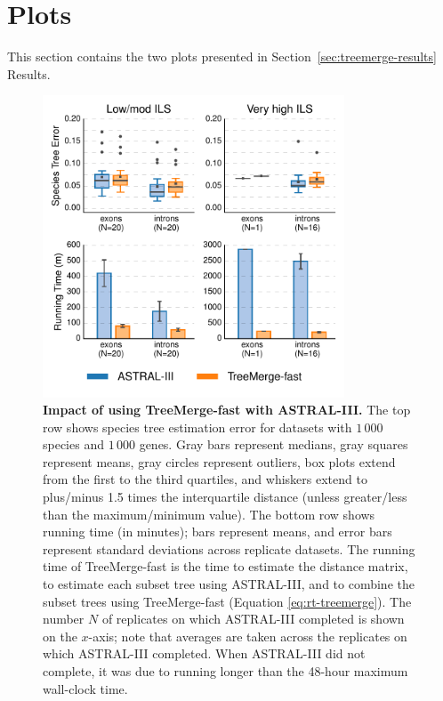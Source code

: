 \clearpage
\newpage

\section{Plots}
\label{sec:treemerge-plots}
This section contains the two plots presented in Section~\ref{sec:treemerge-results} Results.

\vspace{12pt}

\begin{figure}[!h]
\centering
\includegraphics[width=0.8\textwidth]{figures/treemerge-fig4.pdf}
\caption{{\bf Impact of using TreeMerge-fast with ASTRAL-III. }
The top row shows species tree estimation error for datasets with  $1\,000$ species and  $1\,000$ genes. 
Gray bars represent medians, gray squares represent means, gray circles represent outliers, box plots extend from the first to the third quartiles, and whiskers extend to plus/minus 1.5 times the interquartile distance (unless greater/less than the maximum/minimum value).
The bottom row shows running time (in minutes); bars represent means, and error bars represent standard deviations across replicate datasets.
The running time of TreeMerge-fast is the time to estimate the distance matrix, to estimate each subset tree using ASTRAL-III, and to combine the subset trees using TreeMerge-fast (Equation \ref{eq:rt-treemerge}).
The number $N$ of replicates on which ASTRAL-III completed is shown on the $x$-axis; note that averages are taken across the replicates on which ASTRAL-III completed.
When ASTRAL-III did not complete, it was due to running longer than the 48-hour maximum wall-clock time.}
\label{fig:astral}
\end{figure}

